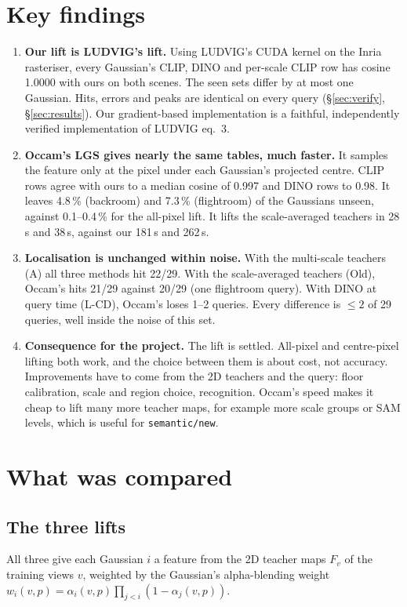 \documentclass[11pt,a4paper]{article}
\newcommand{\code}[1]{\texttt{\small #1}}
\begin{document}
\section{Key findings}
\begin{enumerate}[leftmargin=*,itemsep=2pt]
  \item \textbf{Our lift is LUDVIG's lift.} Using LUDVIG's CUDA kernel on the Inria rasteriser, every Gaussian's CLIP,
        DINO and per-scale CLIP row has cosine 1.0000 with ours on both scenes. The seen sets differ by at most one
        Gaussian. Hits, errors and peaks are identical on every query (\S\ref{sec:verify}, \S\ref{sec:results}). Our
        gradient-based implementation is a faithful, independently verified implementation of LUDVIG eq.~3.
  \item \textbf{Occam's LGS gives nearly the same tables, much faster.} It samples the feature only at the pixel under
        each Gaussian's projected centre. CLIP rows agree with ours to a median cosine of 0.997 and DINO rows to 0.98.
        It leaves 4.8\,\% (backroom) and 7.3\,\% (flightroom) of the Gaussians unseen, against 0.1--0.4\,\% for the
        all-pixel lift. It lifts the scale-averaged teachers in 28\,s and 38\,s, against our 181\,s and 262\,s.
  \item \textbf{Localisation is unchanged within noise.} With the multi-scale teachers (A) all three methods hit 22/29.
        With the scale-averaged teachers (Old), Occam's hits 21/29 against 20/29 (one flightroom query). With DINO at
        query time (L-CD), Occam's loses 1--2 queries. Every difference is $\leq 2$ of 29 queries, well inside the noise
        of this set.
  \item \textbf{Consequence for the project.} The lift is settled. All-pixel and centre-pixel lifting both work, and
        the choice between them is about cost, not accuracy. Improvements have to come from the 2D teachers and the
        query: floor calibration, scale and region choice, recognition. Occam's speed makes it cheap to lift many
        more teacher maps, for example more scale groups or SAM levels, which is useful for \code{semantic/new}.
\end{enumerate}

\section{What was compared}
\subsection{The three lifts}
All three give each Gaussian $i$ a feature from the 2D teacher maps $F_v$ of the training views $v$, weighted by the
Gaussian's alpha-blending weight $w_i(v,p)=\alpha_i(v,p)\prod_{j<i}(1-\alpha_j(v,p))$.
\end{document}
